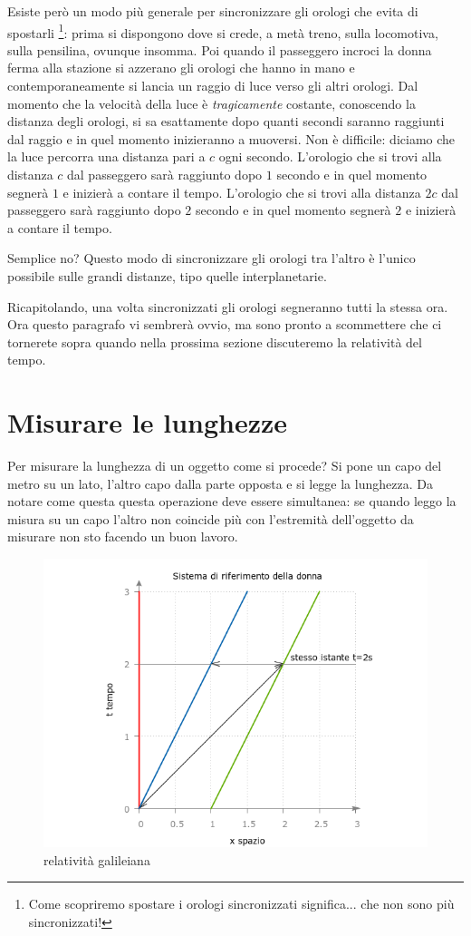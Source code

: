 Esiste però un modo più generale per sincronizzare gli orologi che evita di spostarli \footnote{Come scopriremo spostare i orologi sincronizzati significa... che non sono più sincronizzati!}: prima si dispongono dove si crede, a metà treno, sulla locomotiva, sulla pensilina, ovunque insomma. Poi quando il passeggero incroci la donna ferma alla stazione si azzerano gli orologi che hanno in mano e contemporaneamente si lancia un raggio di luce verso gli altri orologi. Dal momento che la velocità della luce è \textit{tragicamente} costante, conoscendo la distanza degli orologi, si sa esattamente dopo quanti secondi saranno raggiunti dal raggio e in quel momento inizieranno a muoversi. Non è difficile: diciamo che la luce percorra una distanza pari a $c$ ogni secondo. L'orologio che si trovi alla distanza $c$ dal passeggero sarà raggiunto dopo $1$ secondo e in quel momento segnerà $1$ e inizierà a contare il tempo. L'orologio che si trovi alla distanza $2c$ dal passeggero sarà raggiunto dopo $2$ secondo e in quel momento segnerà $2$ e inizierà a contare il tempo.  

Semplice no? Questo modo di sincronizzare gli orologi tra l'altro è l'unico possibile sulle grandi distanze, tipo quelle interplanetarie. 

Ricapitolando, una volta sincronizzati gli orologi segneranno tutti la stessa ora. Ora questo paragrafo vi sembrerà ovvio, ma sono pronto a scommettere che ci tornerete sopra quando nella prossima sezione discuteremo la relatività del tempo.


\section{Misurare le lunghezze}

Per misurare la lunghezza di un oggetto come si procede? Si pone un capo del metro su un lato, l'altro capo dalla parte opposta e si legge la lunghezza. Da notare come questa questa operazione deve essere simultanea: se quando leggo la misura su un capo l'altro non coincide più con l'estremità dell'oggetto da misurare non sto facendo un buon lavoro. 

\begin{figure}[h!]
 \centering
 \includegraphics[scale=0.7]{figure/fig7}
 \caption{relatività galileiana}
\end{figure}


